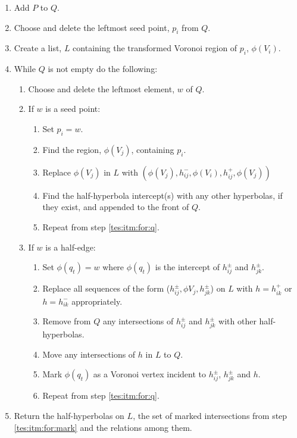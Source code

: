 \begin{enumerate}
  \item Add $P$ to $Q$.
  \item Choose and delete the leftmost seed point, $p_i$ from $Q$.
  \item Create a list, $L$ containing the transformed Voronoi region of $p_i$, $\phi(V_i)$.
  \item\label{tes:itm:for:q} While $Q$ is not empty do the following:
  \begin{enumerate}
    \item Choose and delete the leftmost element, $w$ of $Q$.
    \item If $w$ is a seed point:
    \begin{enumerate}
      \item Set $p_i=w$.
      \item Find the region, $\phi(V_j)$, containing $p_i$.
      \item Replace $\phi(V_j)$ in $L$ with $(\phi(V_j),h^-_{ij},\phi(V_i),h^+_{ij},\phi(V_j))$
      \item Find the half-hyperbola intercept(s) with any other hyperbolas, if they exist, and appended to the front of $Q$.
      \item Repeat from step \ref{tes:itm:for:q}.
    \end{enumerate}
    \item If $w$ is a half-edge:
    \begin{enumerate}
      \item Set $\phi(q_t)=w$ where $\phi(q_t)$ is the intercept of $h^\pm_{ij}$ and $h^\pm_{jk}$.
      \item Replace all sequences of the form ($h^\pm_{ij},\phi{V_j},h^\pm_{jk}$) on $L$ with $h=h^+_{ik}$ or $h=h^-_{ik}$ appropriately.
      \item Remove from $Q$ any intersections of $h^\pm_{ij}$ and $h^\pm_{jk}$ with other half-hyperbolas.
      \item Move any intersections of $h$ in $L$ to $Q$.
      \item\label{tes:itm:for:mark} Mark $\phi(q_t)$ as a Voronoi vertex incident to $h^\pm_{ij}$, $h^\pm_{jk}$ and $h$.
      \item Repeat from step \ref{tes:itm:for:q}.
    \end{enumerate}
  \end{enumerate}
  \item Return the half-hyperbolas on $L$, the set of marked intersections from step \ref{tes:itm:for:mark} and the relations among them.
\end{enumerate}
